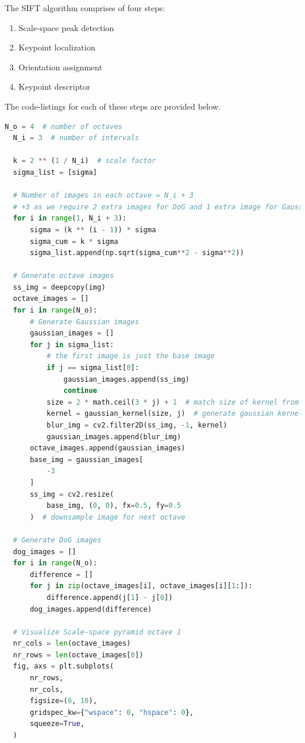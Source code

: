 \documentclass[11pt,a4paper]{article}
\begin{document}
The SIFT algorithm comprises of four steps:

\begin{enumerate}[leftmargin=*]
  \item Scale-space peak detection
  \item Keypoint localization
  \item Orientation assignment
  \item Keypoint descriptor
\end{enumerate}

The code-listings for each of these steps are provided below.

\begin{lstlisting}[language=Python, caption=Scale-space peak detection]
  N_o = 4  # number of octaves
  N_i = 3  # number of intervals

  k = 2 ** (1 / N_i)  # scale factor
  sigma_list = [sigma]

  # Number of images in each octave = N_i + 3
  # +3 as we require 2 extra images for DoG and 1 extra image for Gaussian blur
  for i in range(1, N_i + 3):
      sigma = (k ** (i - 1)) * sigma
      sigma_cum = k * sigma
      sigma_list.append(np.sqrt(sigma_cum**2 - sigma**2))

  # Generate octave images
  ss_img = deepcopy(img)
  octave_images = []
  for i in range(N_o):
      # Generate Gaussian images
      gaussian_images = []
      for j in sigma_list:
          # the first image is just the base image
          if j == sigma_list[0]:
              gaussian_images.append(ss_img)
              continue
          size = 2 * math.ceil(3 * j) + 1  # match size of kernel from opencv
          kernel = gaussian_kernel(size, j)  # generate gaussian kernel
          blur_img = cv2.filter2D(ss_img, -1, kernel)
          gaussian_images.append(blur_img)
      octave_images.append(gaussian_images)
      base_img = gaussian_images[
          -3
      ]
      ss_img = cv2.resize(
          base_img, (0, 0), fx=0.5, fy=0.5
      )  # downsample image for next octave

  # Generate DoG images
  dog_images = []
  for i in range(N_o):
      difference = []
      for j in zip(octave_images[i], octave_images[i][1:]):
          difference.append(j[1] - j[0])
      dog_images.append(difference)

  # Visualize Scale-space pyramid octave 1
  nr_cols = len(octave_images)
  nr_rows = len(octave_images[0])
  fig, axs = plt.subplots(
      nr_rows,
      nr_cols,
      figsize=(6, 10),
      gridspec_kw={"wspace": 0, "hspace": 0},
      squeeze=True,
  )


\end{lstlisting}
\end{document}
